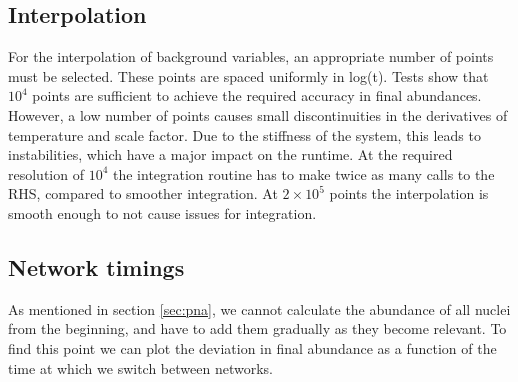 \subsection{Interpolation}
\label{sec:interpolation}
For the interpolation of background variables, an appropriate number of points must be selected. These points are spaced uniformly in log(t). Tests show that $10^4$ points are sufficient to achieve the required accuracy in final abundances. However, a low number of points causes small discontinuities in the derivatives of temperature and scale factor. Due to the stiffness of the system, this leads to instabilities, which have a major impact on the runtime. At the required resolution of $10^4$ the integration routine has to make twice as many calls to the RHS, compared to smoother integration. At $2\times 10^5$ points the interpolation is smooth enough to not cause issues for integration.


\subsection{Network timings}
\label{sec:networktiming}
As mentioned in section \ref{sec:pna}, we cannot calculate the abundance of all nuclei from the beginning, and have to add them gradually as they become relevant. To find this point we can plot the deviation in final abundance as a function of the time at which we switch between networks.
